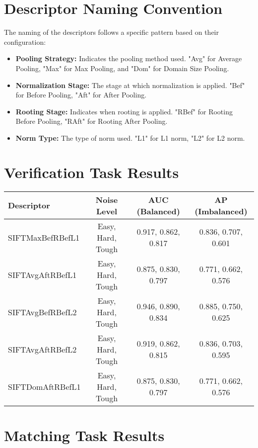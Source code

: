 \section*{Descriptor Naming Convention}

The naming of the descriptors follows a specific pattern based on their configuration:

\begin{itemize}
    \item \textbf{Pooling Strategy:} Indicates the pooling method used. "Avg" for Average Pooling, "Max" for Max Pooling, and "Dom" for Domain Size Pooling.
    \item \textbf{Normalization Stage:} The stage at which normalization is applied. "Bef" for Before Pooling, "Aft" for After Pooling.
    \item \textbf{Rooting Stage:} Indicates when rooting is applied. "RBef" for Rooting Before Pooling, "RAft" for Rooting After Pooling.
    \item \textbf{Norm Type:} The type of norm used. "L1" for L1 norm, "L2" for L2 norm.
\end{itemize}

\section*{Verification Task Results}

\begin{tabular}{lccc}
\toprule
\textbf{Descriptor} & \textbf{Noise Level} & \textbf{AUC (Balanced)} & \textbf{AP (Imbalanced)} \\
\midrule
SIFTMaxBefRBefL1 & Easy, Hard, Tough & 0.917, 0.862, 0.817 & 0.836, 0.707, 0.601 \\
SIFTAvgAftRBefL1 & Easy, Hard, Tough & 0.875, 0.830, 0.797 & 0.771, 0.662, 0.576 \\
SIFTAvgBefRBefL2 & Easy, Hard, Tough & 0.946, 0.890, 0.834 & 0.885, 0.750, 0.625 \\
SIFTAvgAftRBefL2 & Easy, Hard, Tough & 0.919, 0.862, 0.815 & 0.836, 0.703, 0.595 \\
SIFTDomAftRBefL1 & Easy, Hard, Tough & 0.875, 0.830, 0.797 & 0.771, 0.662, 0.576 \\
\bottomrule
\end{tabular}

\section*{Matching Task Results}


